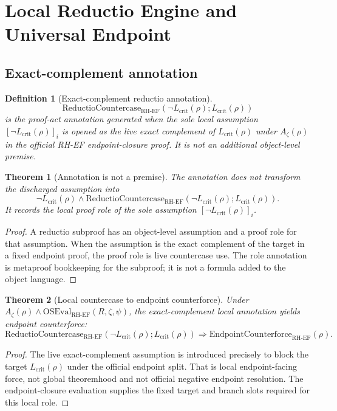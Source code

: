 \documentclass[11pt]{article}
\newtheorem{definition}{Definition}[section]
\newtheorem{theorem}{Theorem}[section]
\newcommand{\Az}{A_{\zeta}}
\newcommand{\Lcrit}{L_{\mathrm{crit}}}
\newcommand{\RH}{\mathrm{RH}}
\newcommand{\EF}{\mathrm{EF}}
\newcommand{\OSEvalEF}{\mathrm{OSEval}_{\mathrm{RH}\text{-}\mathrm{EF}}}
\newcommand{\Counterforce}{\mathrm{EndpointCounterforce}}
\begin{document}
\section{Local Reductio Engine and Universal Endpoint}

\subsection{Exact-complement annotation}

\begin{definition}[Exact-complement reductio annotation]
\[
\mathrm{ReductioCountercase}_{\RH\text{-}\EF}(\neg\Lcrit(\rho);\Lcrit(\rho))
\]
is the proof-act annotation generated when the sole local assumption \([\neg\Lcrit(\rho)]_i\) is opened as the live exact complement of \(\Lcrit(\rho)\) under \(\Az(\rho)\) in the official RH-EF endpoint-closure proof.  It is not an additional object-level premise.
\end{definition}

\begin{theorem}[Annotation is not a premise]
The annotation does not transform the discharged assumption into
\[
\neg\Lcrit(\rho)\wedge \mathrm{ReductioCountercase}_{\RH\text{-}\EF}(\neg\Lcrit(\rho);\Lcrit(\rho)).
\]
It records the local proof role of the sole assumption \([\neg\Lcrit(\rho)]_i\).
\end{theorem}

\begin{proof}
A reductio subproof has an object-level assumption and a proof role for that assumption.  When the assumption is the exact complement of the target in a fixed endpoint proof, the proof role is live countercase use.  The role annotation is metaproof bookkeeping for the subproof; it is not a formula added to the object language.
\end{proof}

\begin{theorem}[Local countercase to endpoint counterforce]
Under \(\Az(\rho)\wedge\OSEvalEF(R,\zeta,\psi)\), the exact-complement local annotation yields endpoint counterforce:
\[
\mathrm{ReductioCountercase}_{\RH\text{-}\EF}(\neg\Lcrit(\rho);\Lcrit(\rho))
\Rightarrow \Counterforce_{\RH\text{-}\EF}(\rho).
\]
\end{theorem}

\begin{proof}
The live exact-complement assumption is introduced precisely to block the target \(\Lcrit(\rho)\) under the official endpoint split.  That is local endpoint-facing force, not global theoremhood and not official negative endpoint resolution.  The endpoint-closure evaluation supplies the fixed target and branch slots required for this local role.
\end{proof}
\end{document}
